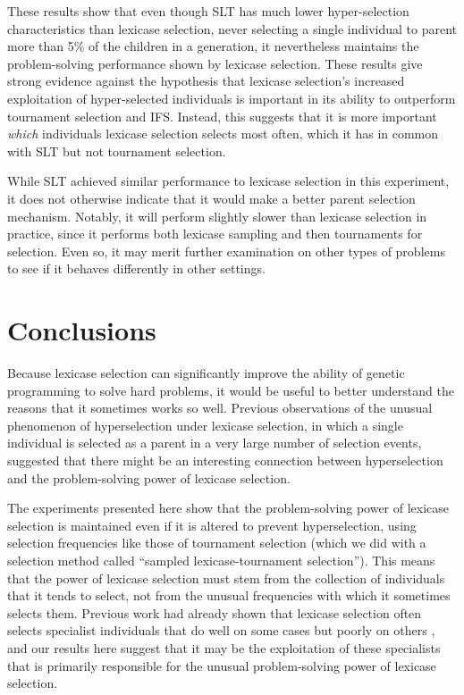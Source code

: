 \documentclass{sig-alternate}
\begin{document}
These results show that even though SLT has much lower hyper-selection characteristics than lexicase selection, never selecting a single individual to parent more than 5\% of the children in a generation, it nevertheless maintains the problem-solving performance shown by lexicase selection. These results give strong evidence against the hypothesis that lexicase selection's increased exploitation of hyper-selected individuals is important in its ability to outperform tournament selection and IFS. Instead, this suggests that it is more important \textit{which} individuals lexicase selection selects most often, which it has in common with SLT but not tournament selection.

While SLT achieved similar performance to lexicase selection in this experiment, it does not otherwise indicate that it would make a better parent selection mechanism. Notably, it will perform slightly slower than lexicase selection in practice, since it performs both lexicase sampling and then tournaments for selection. Even so, it may merit further examination on other types of problems to see if it behaves differently in other settings.


\section{Conclusions}
\label{section:conclusions}

Because lexicase selection can significantly improve the ability of genetic programming to solve hard problems, it would be useful to better understand the reasons that it sometimes works so well. Previous observations of the unusual phenomenon of hyperselection under lexicase selection, in which a single individual is selected as a parent in a very large number of selection events, suggested that there might be an interesting connection between hyperselection and the problem-solving power of lexicase selection.

The experiments presented here show that the problem-solving power of lexicase selection is maintained even if it is altered to prevent hyperselection, using selection frequencies like those of tournament selection (which we did with a selection method called ``sampled lexicase-tournament selection''). This means that the power of lexicase selection must stem from the collection of individuals that it tends to select, not from the unusual frequencies with which it sometimes selects them. Previous work had already shown that lexicase selection often selects specialist individuals that do well on some cases but poorly on others \cite{Helmuth:2015:GPTP,Helmuth:2015:dissertation}, and our results here suggest that it may be the exploitation of these specialists that is primarily responsible for the unusual problem-solving power of lexicase selection.
\end{document}
